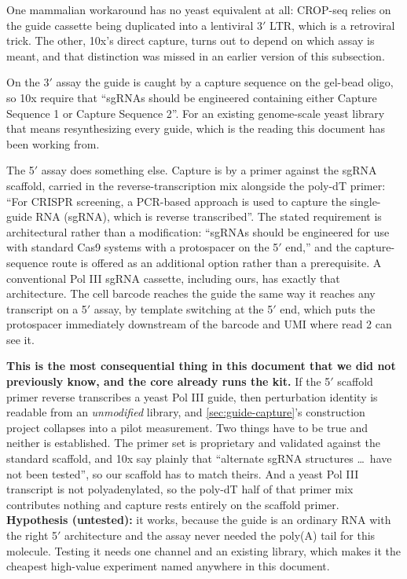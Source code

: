 One mammalian workaround has no yeast equivalent at all: CROP-seq
\citep{datlingerPooledCRISPRScreening2017} relies on the guide cassette being
duplicated into a lentiviral 3$'$ LTR, which is a retroviral trick. The other,
10x's direct capture, turns out to depend on which assay is meant, and that
distinction was missed in an earlier version of this subsection.

 On the 3$'$ assay the guide is
caught by a capture sequence on the gel-bead oligo, so 10x require that
``sgRNAs should be engineered containing either Capture Sequence 1 or Capture
Sequence 2''. For an existing genome-scale yeast library
that means resynthesizing every guide, which is the reading this document has
been working from.

The 5$'$ assay does something else. Capture is by a primer against the sgRNA
scaffold, carried in the reverse-transcription mix alongside the poly-dT primer:
``For CRISPR screening, a PCR-based approach is used to capture the single-guide
RNA (sgRNA), which is reverse transcribed''. The stated
requirement is architectural rather than a modification: ``sgRNAs should be
engineered for use with standard Cas9 systems with a protospacer on the 5$'$
end,'' and the capture-sequence route is offered as an additional option rather
than a prerequisite. A conventional Pol III sgRNA cassette, including ours, has
exactly that architecture. The cell barcode reaches the guide the same way it
reaches any transcript on a 5$'$ assay, by template switching at the 5$'$ end,
which puts the protospacer immediately downstream of the barcode and UMI where
read 2 can see it.

\begin{keybox}
\textbf{This is the most consequential thing in this document that we did not
previously know, and the core already runs the kit.} If the 5$'$ scaffold primer
reverse transcribes a yeast Pol III guide, then perturbation identity is
readable from an \emph{unmodified} library, and \cref{sec:guide-capture}'s
construction project collapses into a pilot measurement. Two things have to be
true and neither is established. The primer set is proprietary and validated
against the standard  scaffold, and 10x say plainly that
``alternate sgRNA structures \dots\ have not been tested'', so our scaffold has to match theirs. And a yeast Pol III transcript
is not polyadenylated, so the poly-dT half of that primer mix contributes
nothing and capture rests entirely on the scaffold primer.
\textbf{Hypothesis (untested):} it works, because the guide is an ordinary RNA
with the right 5$'$ architecture and the assay never needed the poly(A) tail for
this molecule. Testing it needs one channel and an existing library, which makes
it the cheapest high-value experiment named anywhere in this document.
\end{keybox}

